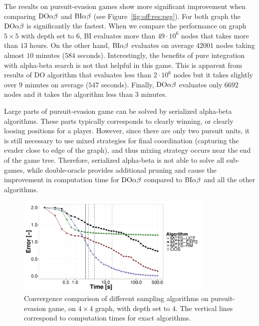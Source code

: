 The results on pursuit-evasion games show more significant improvement when comparing $\textrm{DO}\alpha\beta$ and $\textrm{BI}\alpha\beta$ (see Figure~\ref{fig:off:res:peg}). For both graph the $\textrm{DO}\alpha\beta$ is significantly the fastest. When we compare the performance on graph $5\times5$ with depth set to $6$, \textsc{BI} evaluates more than $49\cdot10^6$ nodes that takes more than $13$ hours. On the other hand, $\textrm{BI}\alpha\beta$ evaluates on average $42001$ nodes taking almost $10$ minutes ($584$ seconds). Interestingly, the benefits of pure integration with alpha-beta search is not that helpful in this game.
This is apparent from results of \textsc{DO} algorithm that evaluates less than $2\cdot10^6$ nodes but it takes slightly over $9$ minutes on average ($547$ seconds). Finally, $\textrm{DO}\alpha\beta$ evaluates only $6692$ nodes and it takes the algorithm less than $3$ minutes.

Large parts of pursuit-evasion game can be solved by serialized alpha-beta algorithms.
These parts typically corresponds to clearly winning, or clearly loosing positions for a player.
However, since there are only two pursuit units, it is still necessary to use mixed strategies for final coordination (capturing the evader close to edge of the graph), and thus mixing strategy occurs near the end of the game tree. 
Therefore, serialized alpha-beta is not able to solve all sub-games, while double-oracle provides additional pruning and cause the improvement in computation time for $\textrm{DO}\alpha\beta$ compared to $\textrm{BI}\alpha\beta$ and all the other algorithms.

\begin{figure}
\centering
\includegraphics[width=0.85\textwidth]{figures/convergence-peg.pdf}
\caption{Convergence comparison of different sampling algorithms on pursuit-evasion game, on $4\times4$ graph, with depth set to $4$. The vertical lines correspond to computation times for exact algorithms.} \label{fig:off:conv:peg}
\end{figure}

